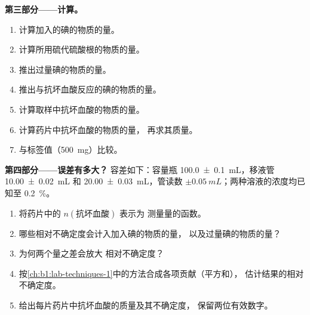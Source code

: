 \begin{problem}
\medskip
\noindent\textbf{第三部分——计算。}
\begin{enumerate}[resume]
  \item 计算加入的碘的物质的量。
  \item 计算所用硫代硫酸根的物质的量。
  \item 推出过量碘的物质的量。
  \item 推出与抗坏血酸反应的碘的物质的量。
  \item 计算取样中抗坏血酸的物质的量。
  \item 计算药片中抗坏血酸的物质的量，
        再求其质量。
  \item 与标签值（\qty{500}{mg}）比较。
\end{enumerate}

\medskip
\noindent\textbf{第四部分——误差有多大？}
容差如下：容量瓶 \qty{100.0 \pm 0.1}{mL}，移液管
\qty{10.00 \pm 0.02}{mL} 和 \qty{20.00 \pm 0.03}{mL}，管读数
$\pm\qty{0.05}{mL}$；两种溶液的浓度均已知至 \qty{0.2}{\percent}。
\begin{enumerate}[resume]
  \item 将药片中的 $n(\text{抗坏血酸})$ 表示为
        测量量的函数。
  \item 哪些相对不确定度会计入加入碘的物质的量，
        以及过量碘的物质的量？
  \item 为何两个量之差会放大
        相对不确定度？
  \item 按\cref{ch:b1:lab-techniques-1}中的方法合成各项贡献（平方和），
        估计结果的相对不确定度。
  \item 给出每片药片中抗坏血酸的质量及其不确定度，
        保留两位有效数字。
\end{enumerate}
\end{problem}

